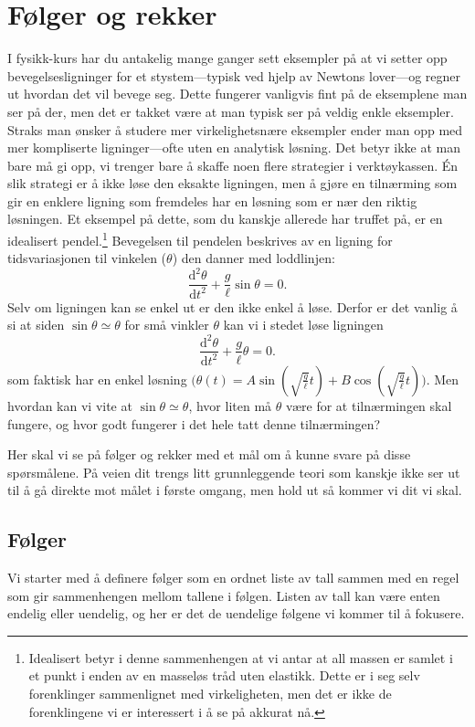 \documentclass[a4paper,norsk,12pt]{article}
\def\d{\ensuremath{\mathrm{d}}}
\begin{document}
\section{Følger og rekker}
I fysikk-kurs har du antakelig mange ganger sett eksempler på at vi setter opp bevegelsesligninger for et stystem---typisk ved hjelp av Newtons lover---og regner ut hvordan det vil bevege seg. Dette fungerer vanligvis fint på de eksemplene man ser på der, men det er takket være at man typisk ser på veldig enkle eksempler. Straks man ønsker å studere mer virkelighetsnære eksempler ender man opp med mer kompliserte ligninger---ofte uten en analytisk løsning. Det betyr ikke at man bare må gi opp, vi trenger bare å skaffe noen flere strategier i verktøykassen. \'En slik strategi er å ikke løse den eksakte ligningen, men å gjøre en tilnærming som gir en enklere ligning som fremdeles har en løsning som er nær den riktig løsningen. Et eksempel på dette, som du kanskje allerede har truffet på, er en idealisert pendel.\footnote{Idealisert betyr i denne sammenhengen at vi antar at all massen er samlet i et punkt i enden av en masseløs tråd uten elastikk. Dette er i seg selv forenklinger sammenlignet med virkeligheten, men det er ikke de forenklingene vi er interessert i å se på akkurat nå.} Bevegelsen til pendelen beskrives av en ligning for tidsvariasjonen til vinkelen ($\theta$) den danner med loddlinjen:
\begin{displaymath}
	\frac{\d^2\theta}{\d t^2} + \frac{g}{\ell}\sin\theta = 0.
\end{displaymath}
Selv om ligningen kan se enkel ut er den ikke enkel å løse. Derfor er det vanlig å si at siden $\sin\theta \simeq \theta$ for små vinkler $\theta$ kan vi i stedet løse ligningen 
\begin{displaymath}
	\frac{\d^2\theta}{\d t^2} + \frac{g}{\ell}\theta = 0.
\end{displaymath}
som faktisk har en enkel løsning $\Big(\theta(t) = A\sin(\sqrt{\frac{g}{\ell}}t) + B\cos(\sqrt{\frac{g}{\ell}}t)\Big)$. Men hvordan kan vi vite at $\sin\theta \simeq \theta$, hvor liten må $\theta$ være for at tilnærmingen skal fungere, og hvor godt fungerer i det hele tatt denne tilnærmingen?

Her skal vi se på følger og rekker med et mål om å kunne svare på disse spørsmålene. På veien dit trengs litt grunnleggende teori som kanskje ikke ser ut til å gå direkte mot målet i første omgang, men hold ut så kommer vi dit vi skal.

\subsection{Følger}
Vi starter med å definere følger som en ordnet liste av tall sammen med en regel som gir sammenhengen mellom tallene i følgen. Listen av tall kan være enten endelig eller uendelig, og her er det de uendelige følgene vi kommer til å fokusere.
\end{document}
